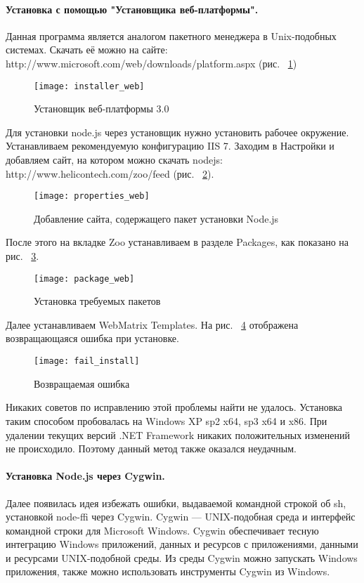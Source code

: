 \paragraph{Установка с помощью "Установщика веб-платформы".}
Данная программа является аналогом пакетного менеджера в Unix-подобных системах. Скачать её можно на сайте: http://www.microsoft.com/web/downloads/platform.aspx (рис. ~\ref{installer_web})
\begin{figure}[!ht]
	\begin{center}
		\texttt{[image: installer\_web]}
	\end{center}
	\caption{Установщик веб-платформы 3.0}
	\label{installer_web}
\end{figure}
Для установки node.js через установщик нужно установить рабочее окружение. 
Устанавливаем рекомендуемую конфигурацию IIS 7. 
Заходим в Настройки и добавляем сайт, на котором можно скачать nodejs:  http://www.helicontech.com/zoo/feed (рис. ~\ref{properties_web}).
\begin{figure}[!ht]
	\begin{center}
		\texttt{[image: properties\_web]}
	\end{center}
	\caption{Добавление сайта, содержащего пакет установки Node.js}
	\label{properties_web}
\end{figure}
После этого на вкладке Zoo устанавливаем в разделе Packages, как показано на рис. ~\ref{package_web}.
\begin{figure}[!ht]
	\begin{center}
		\texttt{[image: package\_web]}
	\end{center}
	\caption{Установка требуемых пакетов}
	\label{package_web}
\end{figure}
Далее устанавливаем WebMatrix Templates. На рис. ~\ref{fail_install} отображена возвращающаяся ошибка при установке.
\begin{figure}[!ht]
	\begin{center}
		\texttt{[image: fail\_install]}
	\end{center}
	\caption{Возвращаемая ошибка}
	\label{fail_install}
\end{figure}
Никаких советов по исправлению этой проблемы найти не удалось. Установка таким способом пробовалась на Windows XP sp2 x64, sp3 x64 и x86. При удалении текущих версий .NET Framework никаких положительных изменений не происходило.  
Поэтому данный метод  также оказался неудачным.

\paragraph{Установка Node.js через Cygwin.}
Далее появилась идея избежать ошибки, выдаваемой командной строкой об sh, установкой node-ffi через Cygwin. 
Cygwin — UNIX-подобная среда и интерфейс командной строки для Microsoft Windows. Cygwin обеспечивает тесную интеграцию Windows приложений, данных и ресурсов с приложениями, данными и ресурсами UNIX-подобной среды. Из среды Cygwin можно запускать Windows приложения, также можно использовать инструменты Cygwin из Windows.

